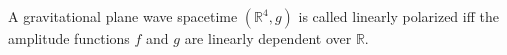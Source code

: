 A gravitational plane wave spacetime $(\mathbb{R}^4, g)$ is called linearly polarized iff the amplitude functions $f$ and $g$ are linearly dependent over $\mathbb{R}$.
